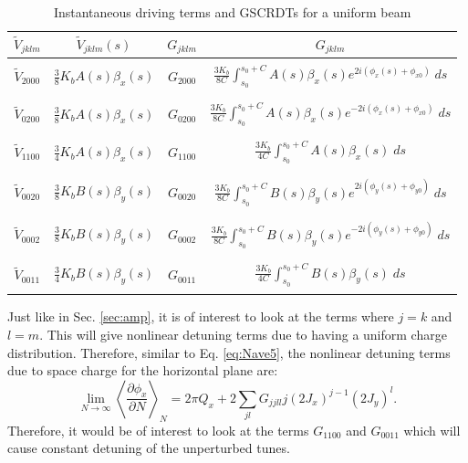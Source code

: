 \begin{table}[H]
    \centering
    \caption{Instantaneous driving terms and GSCRDTs for a uniform beam}
    \label{tab:vjklms}
    \begin{tabular}{|c|c|c|c|}
    \hline
    $\tilde{V}_{jklm}$  &  $\tilde{V}_{jklm}(s)$ & $G_{jklm}$  &  $G_{jklm}$  \\ \hline
    & & & \\
    $\tilde{V}_{2000}$ &  $\frac{3}{8} K_b A(s) \beta_x(s)$ & $G_{2000}$ & $\frac{3K_b}{8C}{\displaystyle\int_{s_0}^{s_0+C} A(s) \beta_x(s) e^{2 i \left( \phi_x(s)+\phi_{x0} \right)} \; ds}$ \\ 
    & & & \\ \hline
    & & & \\
    $\tilde{V}_{0200}$ &  $\frac{3}{8} K_b A(s) \beta_x(s)$ & $G_{0200}$ & $\frac{3K_b}{8C}{\displaystyle\int_{s_0}^{s_0+C} A(s) \beta_x(s) e^{-2 i \left( \phi_x(s)+\phi_{x0} \right)} \; ds}$\\ 
    & & & \\ \hline
    & & & \\
    $\tilde{V}_{1100}$ &  $\frac{3}{4} K_b A(s) \beta_x(s)$ & $G_{1100}$ & $\frac{3K_b}{4C}{\displaystyle\int_{s_0}^{s_0+C} A(s) \beta_x(s) \; ds}$\\ 
    & & & \\ \hline
    & & & \\
    $\tilde{V}_{0020}$ &  $\frac{3}{8} K_b B(s) \beta_y(s)$ & $G_{0020}$ & $\frac{3K_b}{8C}{\displaystyle\int_{s_0}^{s_0+C} B(s) \beta_y(s) e^{2 i \left( \phi_y(s)+\phi_{y0} \right)} \; ds}$\\ 
    & & & \\ \hline
    & & & \\
    $\tilde{V}_{0002}$ &  $\frac{3}{8} K_b B(s) \beta_y(s)$ & $G_{0002}$ & $\frac{3K_b}{8C}{\displaystyle\int_{s_0}^{s_0+C} B(s) \beta_y(s) e^{-2 i \left( \phi_y(s)+\phi_{y0} \right)} \; ds}$\\ 
    & & & \\ \hline
    & & & \\
    $\tilde{V}_{0011}$ &  $\frac{3}{4} K_b B(s) \beta_y(s)$ & $G_{0011}$ & $\frac{3K_b}{4C}{\displaystyle\int_{s_0}^{s_0+C} B(s) \beta_y(s) \; ds}$\\ 
    & & & \\ \hline
    \end{tabular}
    \end{table}

Just like in Sec. \ref{sec:amp}, it is of interest to look at the terms where $j=k$ and $l=m$. This will give nonlinear detuning terms due to having a uniform charge distribution. Therefore, similar to Eq. \ref{eq:Nave5}, the nonlinear detuning terms due to space charge for the horizontal plane are:
\begin{equation}
    \label{eq:scave1}
    \lim_{N\to\infty} \left\langle \frac{\partial \phi_x}{\partial N}\right\rangle _N = 2\pi Q_x+2\sum_{jl} G_{jjll} j \left( 2 J_x\right)^{j-1} \left( 2 J_y\right)^{l}.
\end{equation}
Therefore, it would be of interest to look at the terms $G_{1100}$ and $G_{0011}$ which will cause constant detuning of the unperturbed tunes. 

